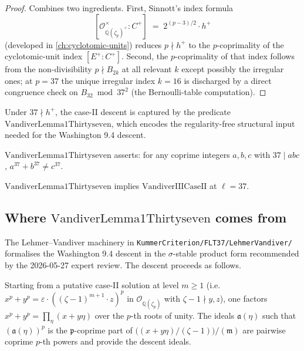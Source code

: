 \begin{proof}\leanok
  Combines two ingredients.  First, Sinnott's index formula
  \[
    [\mathcal O_{\mathbb Q(\zeta_p)^+}^\times : C^+] \;=\; 2^{(p-3)/2} \cdot h^+
  \]
  (developed in \cref{ch:cyclotomic-units}) reduces $p \nmid h^+$ to the
  $p$-coprimality of the cyclotomic-unit index $[E^+ : C^+]$.  Second, the
  $p$-coprimality of that index follows from the non-divisibility
  $p \nmid B_{2k}$ at all relevant $k$ except possibly the irregular ones;
  at $p = 37$ the unique irregular index $k = 16$ is discharged by a
  direct congruence check on $B_{32}\bmod 37^2$ (the Bernoulli-table
  computation).
\end{proof}

Under $37 \nmid h^+$, the case-II descent is captured by the predicate
$\mathrm{VandiverLemma1Thirtyseven}$, which encodes the
regularity-free structural input needed for the Washington 9.4 descent.

\begin{definition}
  \label{def:vandiverLemma1Thirtyseven}
  \leanok
  $\mathrm{VandiverLemma1Thirtyseven}$ asserts: for any coprime
  integers $a,b,c$ with $37 \mid abc$, $a^{37} + b^{37} \neq c^{37}$.
\end{definition}

\begin{theorem}
  \label{thm:caseII_thirtyseven_of_vandiverLemma1}
  \leanok
  $\mathrm{VandiverLemma1Thirtyseven}$ implies $\mathrm{VandiverIIICaseII}$
  at $\ell = 37$.
\end{theorem}

\subsection*{Where $\mathrm{VandiverLemma1Thirtyseven}$ comes from}

The Lehmer--Vandiver machinery in
\texttt{KummerCriterion/FLT37/LehmerVandiver/} formalises the
Washington 9.4 descent in the $\sigma$-stable product form recommended
by the 2026-05-27 expert review.  The descent proceeds as follows.

Starting from a putative case-II solution at level $m \ge 1$
(i.e.\ $x^p + y^p = \varepsilon \cdot ((\zeta-1)^{m+1} \cdot z)^p$ in
$\mathcal O_{\mathbb Q(\zeta_p)}$ with $\zeta - 1 \nmid y, z$), one
factors $x^p + y^p = \prod_\eta (x + y\eta)$ over the $p$-th roots of
unity.  The ideals $\mathfrak a(\eta)$ such that
$(\mathfrak a(\eta))^p$ is the $\mathfrak p$-coprime part of
$\bigl((x + y\eta)/(\zeta-1)\bigr)/(\mathfrak m)$ are pairwise coprime
$p$-th powers and provide the descent ideals.


